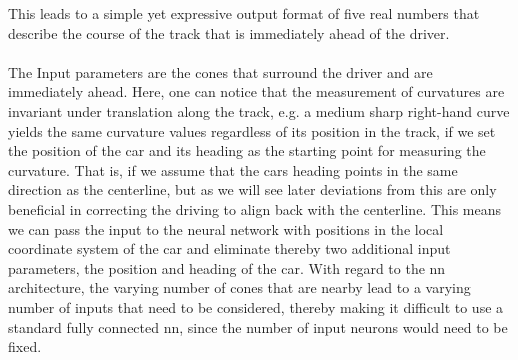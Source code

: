 This leads to a simple yet expressive output format of five real numbers that describe the course of the track that is immediately ahead of the driver. \\\\The Input parameters are the cones that surround the driver and are immediately ahead. Here, one can notice that the measurement of curvatures are invariant under translation along the track, e.g. a medium sharp right-hand curve yields the same curvature values regardless of its position in the track, if we set the position of the car and its heading as the starting point for measuring the curvature. That is, if we assume that the cars heading points in the same direction as the centerline, but as we will see later deviations from this are only beneficial in correcting the driving to align back with the centerline. This means we can pass the input to the neural network with positions in the local coordinate system of the car and eliminate thereby two additional input parameters, the position and heading of the car. With regard to the \ac{nn} architecture, the varying number of cones that are nearby lead to a varying number of inputs that need to be considered, thereby making it difficult to use a standard fully connected \ac{nn}, since the number of input neurons would need to be fixed.
